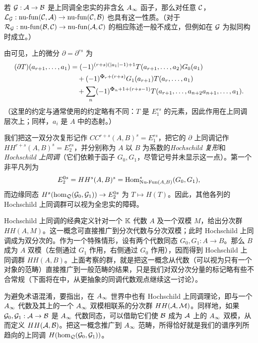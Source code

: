 \begin{lemma}\label{st:1.7}
若 $\mathcal G:\mathcal A\to\mathcal B$ 是上同调全忠实的非含幺 $A_\infty$ 函子，那么对任意 $\mathcal C$，$\mathcal L_{\mathcal G}:\operatorname{nu\text{-}fun}(\mathcal C,\mathcal A)\to\operatorname{nu\text{-}fun}(\mathcal C,\mathcal B)$ 也具有这一性质。（对于 $\mathcal R_{\mathcal G}:\operatorname{nu\text{-}fun}(\mathcal B,\mathcal C)\to\operatorname{nu\text{-}fun}(\mathcal A,\mathcal C)$ 的相应陈述一般不成立，但例如在 $\mathcal G$ 为拟同构时成立。）
\end{lemma}

由可见，上的微分 $\partial=\partial^{rs}$ 为
\[
\begin{aligned}
(\partial T)(a_{r+1},\ldots,a_1)
&=(-1)^{(r+s)(|a_1|-1)+1}T(a_{r+1},\ldots,a_2)G_0(a_1)\\
&\quad+(-1)^{\sgnmark_r+(r+s)}G_1(a_{r+1})T(a_r,\ldots,a_1)\\
&\quad+\sum_n(-1)^{\sgnmark_n+1+(r+s-1)}T(a_{r+1},\ldots,a_{n+2}a_{n+1},\ldots,a_1).
\end{aligned}
\]
（这里的约定与通常使用的约定略有不同：$T$ 是 $E_1^{rs}$ 的元素，因此作用在上同调层次上；同样，$a_i$ 是 $A$ 中的态射。）

\begin{definition*}
我们把这一双分次复形记作 $CC^{r+s}(A,B)^s=E_1^{rs}$，把它的 $\partial$ 上同调记作 $HH^{r+s}(A,B)^s=E_2^{rs}$，并分别称为 $A$ 以 $B$ 为系数的\emph{Hochschild 复形}和\emph{Hochschild 上同调}（它们依赖于函子 $G_0,G_1$，尽管记号并未显示这一点）。第一个非平凡列为
\[
E_2^{0s}=HH^s(A,B)^s=\operatorname{Hom}^s_{\operatorname{Nu\text{-}Fun}(A,B)}(G_0,G_1),
\]
而边缘同态 $H^s(\hom_{\mathcal Q}(\mathcal G_0,\mathcal G_1))\to E_2^{0s}$ 为 $T\mapsto H(T)$。因此，其他各列的 Hochschild 上同调群可以视为全忠实的障碍。
\end{definition*}

\begin{note}\label{st:1.8}
Hochschild 上同调的经典定义针对一个 $\mathbb K$ 代数 $A$ 及一个双模 $M$，给出分次群 $HH(A,M)$。这一概念可直接推广到分次代数与分次双模；此时 Hochschild 上同调成为双分次的。作为一个特殊情形，设有两个代数同态 $G_0,G_1:A\to B$。那么 $B$ 成为 $A$ 双模（左侧通过 $G_1$ 作用，右侧通过 $G_0$ 作用），因而得到 Hochschild 上同调群 $HH(A,B)$。上面考察的群，就是把这一概念从代数（可以视为只有一个对象的范畴）直接推广到一般范畴的结果，只是我们对双分次分量的标记略有些不合常规（下面将在中，从更抽象的同调代数观点继续这一讨论）。

为避免术语混淆，要指出，在 $A_\infty$ 世界中也有 Hochschild 上同调理论，即与一个 $A_\infty$ 代数及其上的一个 $A_\infty$ 双模相联系的分次群 $HH(\mathcal A,\mathcal M)$。同样地，如果 $\mathcal G_0,\mathcal G_1:\mathcal A\to\mathcal B$ 是 $A_\infty$ 代数同态，可以借助它们使 $\mathcal B$ 成为 $\mathcal A$ 上的 $A_\infty$ 双模，从而定义 $HH(\mathcal A,\mathcal B)$。把这一概念推广到 $A_\infty$ 范畴，所得恰好就是我们的谱序列所趋向的上同调 $H(\hom_{\mathcal Q}(\mathcal G_0,\mathcal G_1))$。
\end{note}

